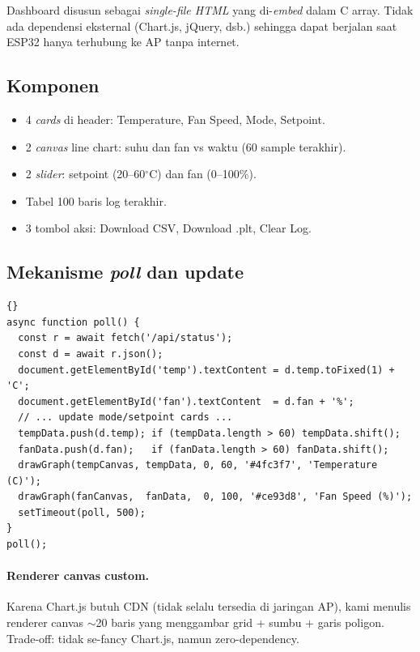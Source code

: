 \documentclass[11pt,a4paper]{article}
\begin{document}
Dashboard disusun sebagai \emph{single-file HTML} yang di-\emph{embed} dalam C array. Tidak ada dependensi eksternal (Chart.js, jQuery, dsb.) sehingga dapat berjalan saat ESP32 hanya terhubung ke AP tanpa internet.

\subsection{Komponen}
\begin{itemize}
    \item 4 \emph{cards} di header: Temperature, Fan Speed, Mode, Setpoint.
    \item 2 \emph{canvas} line chart: suhu dan fan vs waktu (60 sample terakhir).
    \item 2 \emph{slider}: setpoint (20--60$^{\circ}$C) dan fan (0--100\%).
    \item Tabel 100 baris log terakhir.
    \item 3 tombol aksi: Download CSV, Download .plt, Clear Log.
\end{itemize}

\subsection{Mekanisme \emph{poll} dan update}

\begin{lstlisting}[caption={Fungsi \texttt{poll()} pada dashboard}]{}
async function poll() {
  const r = await fetch('/api/status');
  const d = await r.json();
  document.getElementById('temp').textContent = d.temp.toFixed(1) + 'C';
  document.getElementById('fan').textContent  = d.fan + '%';
  // ... update mode/setpoint cards ...
  tempData.push(d.temp); if (tempData.length > 60) tempData.shift();
  fanData.push(d.fan);   if (fanData.length > 60) fanData.shift();
  drawGraph(tempCanvas, tempData, 0, 60, '#4fc3f7', 'Temperature (C)');
  drawGraph(fanCanvas,  fanData,  0, 100, '#ce93d8', 'Fan Speed (%)');
  setTimeout(poll, 500);
}
poll();
\end{lstlisting}

\paragraph{Renderer canvas custom.} Karena Chart.js butuh CDN (tidak selalu tersedia di jaringan AP), kami menulis renderer canvas $\sim$20 baris yang menggambar grid + sumbu + garis poligon. Trade-off: tidak se-fancy Chart.js, namun zero-dependency.
\end{document}
